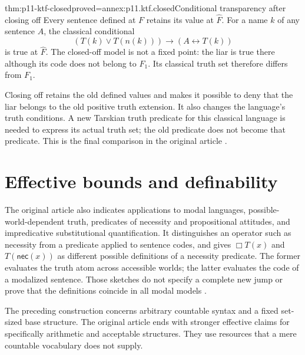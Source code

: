 \begin{hbtheorem}{thm:p11-ktf-closed}{proved=annex:p11.ktf.closed}{Conditional transparency after closing off}
Every sentence defined at \(F\) retains its value at \(\widehat F\).
For a name \(k\) of any sentence \(A\), the classical conditional
\[
 (T(k)\lor T(n(k)))\to(A\leftrightarrow T(k))
\]
is true at \(\widehat F\). The closed-off model is not a fixed point:
the liar is true there although its code does not belong to \(F_1\).
Its classical truth set therefore differs from \(F_1\).
\end{hbtheorem}

Closing off retains the old defined values and makes it possible to deny
that the liar belongs to the old positive truth extension. It also changes
the language's truth conditions. A new Tarskian truth predicate for this
classical language is needed to express its actual truth set; the old
predicate does not become that predicate. This is the final comparison in
the original article \cite[pp.~714--715]{Kripke1975}.

\section{Effective bounds and definability}

The original article also indicates applications to modal languages,
possible-world-dependent truth, predicates of necessity and propositional
attitudes, and impredicative substitutional quantification. It distinguishes
an operator such as necessity from a predicate applied to sentence codes,
and gives \(\Box T(x)\) and \(T(\mathsf{nec}(x))\) as different
possible definitions of a necessity predicate. The former evaluates the
truth atom across accessible worlds; the latter evaluates the code of a
modalized sentence. Those sketches do not specify a complete new jump or
prove that the definitions coincide in all modal models
\cite[pp.~712--714 and nn.~31--33]{Kripke1975}.

The preceding construction concerns arbitrary countable syntax and a fixed
set-sized base structure. The original article ends with stronger effective
claims for specifically arithmetic and acceptable structures. They use
resources that a mere countable vocabulary does not supply.

